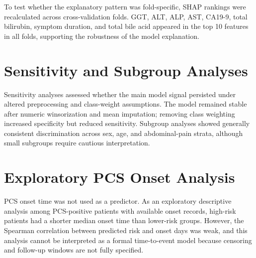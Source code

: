 \documentclass[11pt]{article}
\begin{document}
To test whether the explanatory pattern was fold-specific, SHAP rankings were recalculated across cross-validation folds. GGT, ALT, ALP, AST, CA19-9, total bilirubin, symptom duration, and total bile acid appeared in the top 10 features in all folds, supporting the robustness of the model explanation.

\begin{table}[H]
\centering
\caption{Cross-fold SHAP top-10 stability.}
\label{tab:shap_stability}
\small
\TableShapStability
\end{table}

\section{Sensitivity and Subgroup Analyses}

Sensitivity analyses assessed whether the main model signal persisted under altered preprocessing and class-weight assumptions. The model remained stable after numeric winsorization and mean imputation; removing class weighting increased specificity but reduced sensitivity. Subgroup analyses showed generally consistent discrimination across sex, age, and abdominal-pain strata, although small subgroups require cautious interpretation.

\begin{table}[H]
\centering
\caption{Sensitivity analyses for preprocessing and class weighting.}
\label{tab:sensitivity}
\small
\resizebox{\textwidth}{!}{\TableSensitivity}
\end{table}

\begin{table}[H]
\centering
\caption{Subgroup performance using Random Forest out-of-fold predictions.}
\label{tab:subgroup}
\scriptsize
\resizebox{\textwidth}{!}{\TableSubgroupPerformance}
\end{table}

\section{Exploratory PCS Onset Analysis}

PCS onset time was not used as a predictor. As an exploratory descriptive analysis among PCS-positive patients with available onset records, high-risk patients had a shorter median onset time than lower-risk groups. However, the Spearman correlation between predicted risk and onset days was weak, and this analysis cannot be interpreted as a formal time-to-event model because censoring and follow-up windows are not fully specified.
\end{document}
